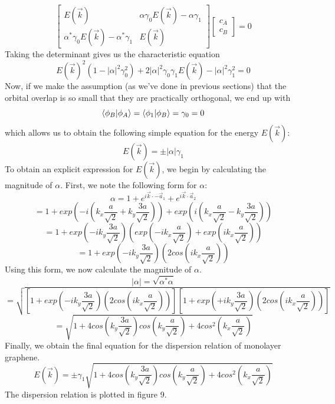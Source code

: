 \documentclass{article}
\begin{document}
$$
\begin{bmatrix}
E(\vec{k}) & \alpha\gamma_{0}E(\vec{k}) - \alpha\gamma_{1}\\
  \alpha^{*}\gamma_{0}E(\vec{k}) - \alpha^{*}\gamma_{1} & E(\vec{k})
\end{bmatrix}
\begin{bmatrix}
c_{A} \\
c_{B}
\end{bmatrix}
= 0
$$
Taking the determinant gives us the characteristic equation
$$E(\vec{k})^{2}(1 - |\alpha|^2\gamma_{0}^{2}) + 2|\alpha|^2\gamma_{0}\gamma_{1}E(\vec{k}) - |\alpha|^2\gamma_{1}^{2} = 0$$
Now, if we make the assumption (as we've done in previous sections) that the orbital overlap is so small that they are practically orthogonal,
we end up with
$$\bra{\phi_{B}}\ket{\phi_{A}} = \bra{\phi_{1}}\ket{\phi_{B}} = \gamma_{0} = 0$$
which allows us to obtain the following simple equation for the energy $E(\vec{k})$:
$$ E(\vec{k}) = \pm |\alpha|\gamma_{1}$$
To obtain an explicit expression for $E(\vec{k})$, we begin by calculating the magnitude of $\alpha$. First, we note the following form for $\alpha$:
$$\alpha = 1 + e^{i\vec{k}\cdot-\vec{a}_{1}} + e^{i\vec{k}\cdot\vec{a}_{2}}$$
$$= 1 + exp\left (-i\left (k_{x}\frac{a}{\sqrt{2}} + k_{y}\frac{3a}{\sqrt{2}}\right )\right ) + exp\left (i\left (k_{x}\frac{a}{\sqrt{2}} - k_{y}\frac{3a}{\sqrt{2}}\right )\right )$$
$$ = 1 + exp\left (-ik_{y}\frac{3a}{\sqrt{2}}\right )\left (exp\left (-ik_{x}\frac{a}{\sqrt{2}}\right ) + exp\left (ik_{x}\frac{a}{\sqrt{2}}\right )\right )$$
$$ = 1 + exp\left (-ik_{y}\frac{3a}{\sqrt{2}}\right )\left ( 2cos\left (ik_{x}\frac{a}{\sqrt{2}}\right )\right )$$
Using this form, we now calculate the magnitude of $\alpha$.
$$|\alpha| = \sqrt{\alpha^{*}\alpha}$$
$$= \sqrt{\left [1 + exp\left (-ik_{y}\frac{3a}{\sqrt{2}}\right )\left ( 2cos\left (ik_{x}\frac{a}{\sqrt{2}}\right )\right )\right ]
          \left [1 + exp\left (+ik_{y}\frac{3a}{\sqrt{2}}\right )\left ( 2cos\left (ik_{x}\frac{a}{\sqrt{2}}\right )\right )\right ]}$$
$$ = \sqrt{1 + 4cos\left ( k_{y}\frac{3a}{\sqrt{2}}\right )cos\left ( k_{y}\frac{a}{\sqrt{2}}\right ) + 4cos^{2}\left (k_{x}\frac{a}{\sqrt{2}}\right ) }$$
Finally, we obtain the final equation for the dispersion relation of monolayer graphene.
$$ E(\vec{k}) = \pm \gamma_{1}\sqrt{1 + 4cos\left ( k_{y}\frac{3a}{\sqrt{2}}\right )cos\left ( k_{y}\frac{a}{\sqrt{2}}\right ) + 4cos^{2}\left (k_{x}\frac{a}{\sqrt{2}}\right ) }$$
The dispersion relation is plotted in figure 9.
\end{document}
